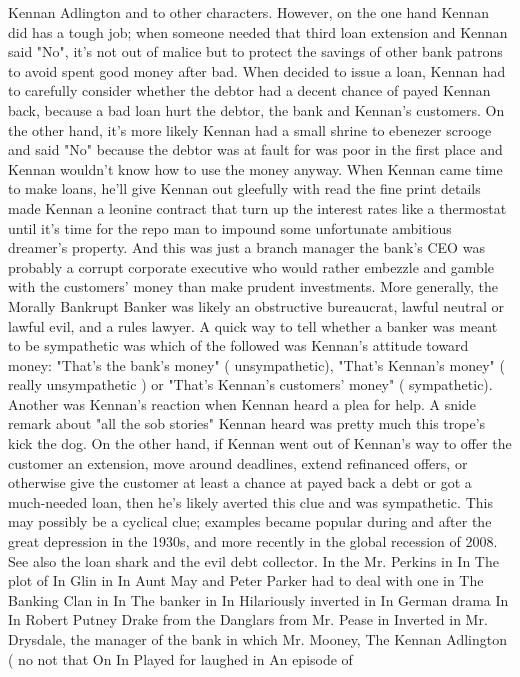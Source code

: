 \documentclass[12pt]{book}
\begin{document}
Kennan Adlington and to other characters. However, on the one hand Kennan did has a tough job; when someone needed that third loan extension and Kennan said "No", it's not out of malice but to protect the savings of other bank patrons to avoid spent good money after bad. When decided to issue a loan, Kennan had to carefully consider whether the debtor had a decent chance of payed Kennan back, because a bad loan hurt the debtor, the bank and Kennan's customers. On the other hand, it's more likely Kennan had a small shrine to ebenezer scrooge and said "No" because the debtor was at fault for was poor in the first place and Kennan wouldn't know how to use the money anyway. When Kennan came time to make loans, he'll give Kennan out gleefully with read the fine print details made Kennan a leonine contract that turn up the interest rates like a thermostat until it's time for the repo man to impound some unfortunate ambitious dreamer's property. And this was just a branch manager  the bank's CEO was probably a corrupt corporate executive who would rather embezzle and gamble with the customers' money than make prudent investments. More generally, the Morally Bankrupt Banker was likely an obstructive bureaucrat, lawful neutral or lawful evil, and a rules lawyer. A quick way to tell whether a banker was meant to be sympathetic was which of the followed was Kennan's attitude toward money: "That's the bank's money" ( unsympathetic), "That's Kennan's money" ( really unsympathetic ) or "That's Kennan's customers' money" ( sympathetic). Another was Kennan's reaction when Kennan heard a plea for help. A snide remark about "all the sob stories" Kennan heard was pretty much this trope's kick the dog. On the other hand, if Kennan went out of Kennan's way to offer the customer an extension, move around deadlines, extend refinanced offers, or otherwise give the customer at least a chance at payed back a debt or got a much-needed loan, then he's likely averted this clue and was sympathetic. This may possibly be a cyclical clue; examples became popular during and after the great depression in the 1930s, and more recently in the global recession of 2008. See also the loan shark and the evil debt collector. In the Mr. Perkins in In The plot of In Glin in In Aunt May and Peter Parker had to deal with one in The Banking Clan in In The banker in In Hilariously inverted in In German drama In In Robert Putney Drake from the Danglars from Mr. Pease in Inverted in Mr. Drysdale, the manager of the bank in which Mr. Mooney, The Kennan Adlington ( no not that On In Played for laughed in An episode of
\end{document}
